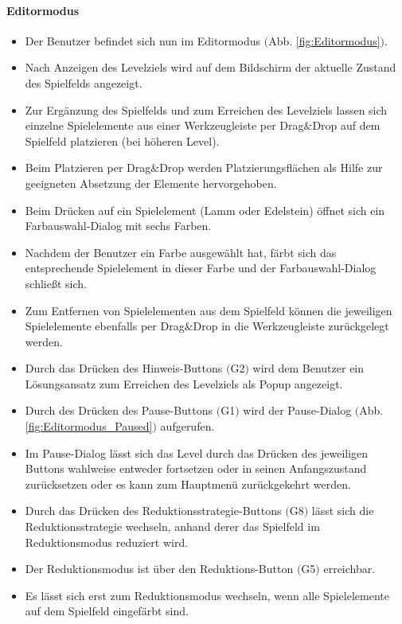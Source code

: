 \paragraph{Editormodus}
\begin{itemize}
\item Der Benutzer befindet sich nun im Editormodus $($Abb. \ref{fig:Editormodus}$)$.
	\item Nach Anzeigen des Levelziels wird auf dem Bildschirm der aktuelle Zustand des Spielfelds angezeigt.
	\item Zur Ergänzung des Spielfelds und zum Erreichen des Levelziels lassen sich einzelne Spielelemente aus einer Werkzeugleiste per Drag$\&$Drop auf dem Spielfeld platzieren (bei höheren Level).
	\item Beim Platzieren per Drag$\&$Drop werden Platzierungsflächen als Hilfe zur geeigneten Absetzung der Elemente hervorgehoben.
	\item Beim Drücken auf ein Spielelement (Lamm oder Edelstein) öffnet sich ein Farbauswahl-Dialog mit sechs Farben.
	\item Nachdem der Benutzer ein Farbe ausgewählt hat, färbt sich das entsprechende Spielelement in dieser Farbe und der Farbauswahl-Dialog schließt sich.
	\item Zum Entfernen von Spielelementen aus dem Spielfeld können die jeweiligen Spielelemente ebenfalls per Drag$\&$Drop in die Werkzeugleiste zurückgelegt werden.
	\item Durch das Drücken des Hinweis-Buttons $($G2$)$ wird dem Benutzer ein Lösungsansatz zum Erreichen des Levelziels als Popup angezeigt.
	\item Durch des Drücken des Pause-Buttons $($G1$)$ wird der Pause-Dialog $($Abb. \ref{fig:Editormodus_Paused}$)$ aufgerufen.
	\item Im Pause-Dialog lässt sich das Level durch das Drücken des jeweiligen Buttons wahlweise entweder fortsetzen oder in seinen Anfangszustand zurücksetzen oder es kann zum Hauptmenü zurückgekehrt werden.
	\item Durch das Drücken des Reduktionsstrategie-Buttons $($G8$)$ lässt sich die Reduktionsstrategie wechseln, anhand derer das Spielfeld im Reduktionsmodus reduziert wird.
	\item Der Reduktionsmodus ist über den Reduktions-Button $($G5$)$ erreichbar. 
	\item Es lässt sich erst zum Reduktionsmodus wechseln, wenn alle Spielelemente auf dem Spielfeld eingefärbt sind.
\end{itemize}

